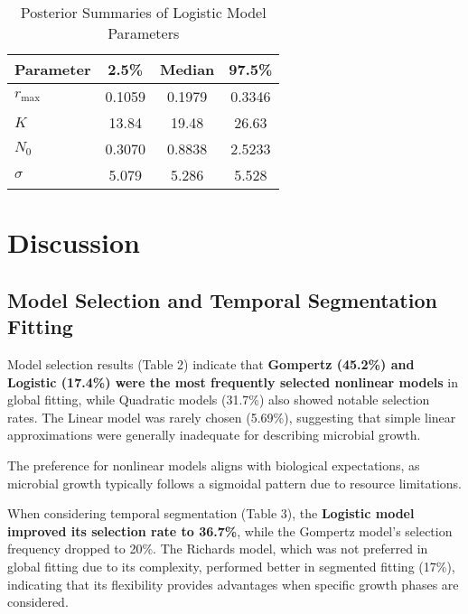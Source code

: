 \documentclass{article}
\begin{document}
\FloatBarrier
\vspace{-0.5cm} %
\begin{table}[h]
    \centering
    \caption{Posterior Summaries of Logistic Model Parameters}
    \label{tab:bayesian_parameters_logistic}
    \renewcommand{\arraystretch}{1.2}
    \setlength{\tabcolsep}{6pt}
    \small
    \begin{tabular}{lccc}
        \hline
        \textbf{Parameter} & \textbf{2.5\%} & \textbf{Median} & \textbf{97.5\%} \\
        \hline
        $r_{\max}$  & 0.1059  & 0.1979  & 0.3346 \\
        $K$         & 13.84   & 19.48   & 26.63  \\
        $N_0$       & 0.3070  & 0.8838  & 2.5233 \\
        $\sigma$    & 5.079   & 5.286   & 5.528  \\
        \hline
    \end{tabular}
\end{table}


\section{Discussion}

\subsection{Model Selection and Temporal Segmentation Fitting}
Model selection results (Table 2) indicate that \textbf{Gompertz (45.2\%) and Logistic (17.4\%) were the most frequently selected nonlinear models} in global fitting, while Quadratic models (31.7\%) also showed notable selection rates. The Linear model was rarely chosen (5.69\%), suggesting that simple linear approximations were generally inadequate for describing microbial growth. 

The preference for nonlinear models aligns with biological expectations, as microbial growth typically follows a sigmoidal pattern due to resource limitations. 

When considering temporal segmentation (Table 3), the \textbf{Logistic model improved its selection rate to 36.7\%}, while the Gompertz model's selection frequency dropped to 20\%. The Richards model, which was not preferred in global fitting due to its complexity, performed better in segmented fitting (17\%), indicating that its flexibility provides advantages when specific growth phases are considered. 
\end{document}
